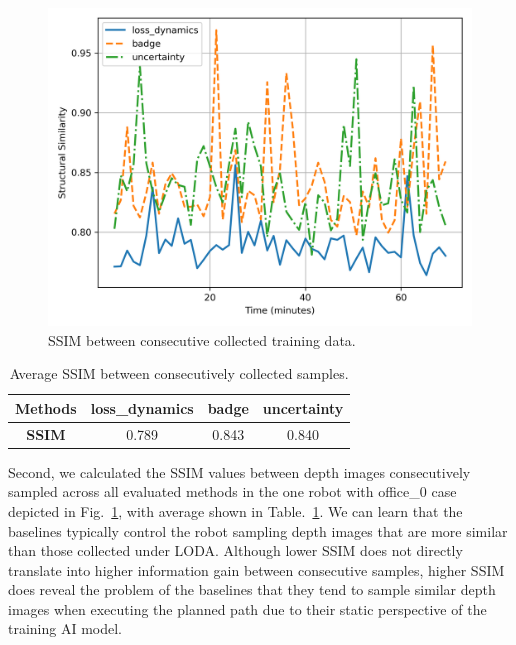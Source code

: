 \begin{figure}[h!]
    \centering
    \vspace{-0.3cm}
    \includegraphics[width=0.7\linewidth]{fig/breakdown_similarity.png}
    \vspace{-0.5cm}
    \caption{SSIM between consecutive collected training data.}
    \label{similarity}
    \vspace{-0.7cm}
\end{figure}

\begin{table}[h!]
    \begin{center}
    \vspace{-0.3cm}
      \caption{Average SSIM between consecutively collected samples.}
    \vspace{-0.4cm}
      \begin{tabular}{c|c|c|c} %
        \textbf{Methods} & loss\_dynamics & badge & uncertainty \\
        \hline
        \textbf{SSIM} & 0.789 & 0.843 & 0.840
        \label{table:similarity}
      \end{tabular}
    \end{center}
    \vspace{-0.3cm}
  \end{table}

Second, we calculated the SSIM values between depth images consecutively sampled across all evaluated methods in the  one robot with office\_0 case depicted in Fig.~\ref{similarity}, with average shown in Table.~\ref{table:similarity}.
We can learn that the baselines typically control the robot sampling depth images that are more similar than those collected under LODA.
Although lower SSIM does not directly translate into higher information gain between consecutive samples, higher SSIM does reveal the problem of the baselines that they tend to sample similar depth images when executing the planned path due to their static perspective of the training AI model.




